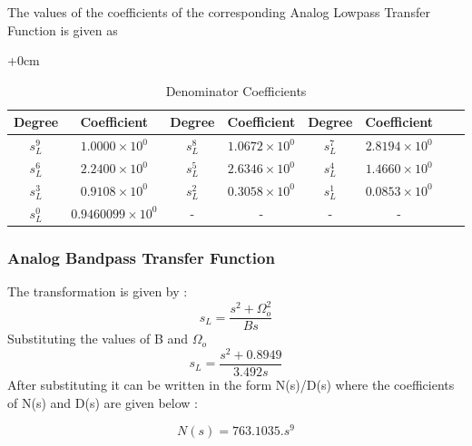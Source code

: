 \documentclass{article}
\begin{document}
The values of the coefficients of the corresponding Analog Lowpass Transfer Function  is given as
\begin{table}[H]
    \centering
    \begin{adjustwidth}{+0cm}{}
        \caption{Denominator Coefficients}
        \begin{tabular}{|c|c|c|c|c|c|c|c|}
            \hline
            Degree & Coefficient & Degree & Coefficient & Degree & Coefficient\\
            \hline
            $s_L^{9}$ & $1.0000 \times 10^{0}$ & $s_L^{8}$ & $1.0672 \times 10^{0}$ & $s_L^{7}$ & $2.8194 \times 10^{0}$ \\
            \hline
            $s_L^{6}$ & $2.2400 \times 10^{0}$ & $s_L^{5}$ & $2.6346 \times 10^{0}$ & $s_L^{4}$ & $1.4660 \times 10^{0}$ \\
            \hline
            $s_L^{3}$ & $0.9108 \times 10^{0}$ & $s_L^{2}$ & $0.3058 \times 10^{0}$ & $s_L^{1}$ & $0.0853 \times 10^{0}$ \\
            \hline
            $s_L^{0}$ & $0.9460099 \times 10^{0}$ & - & -& -&- \\
            \hline
        \end{tabular}
    \end{adjustwidth}
\end{table}
\subsubsection{Analog Bandpass Transfer Function}
The transformation is given by :
\begin{equation*}
    s_L = \frac{s^2 + \Omega_o^2 }{Bs}
\end{equation*}
Substituting the values of B and $\Omega_o$
\begin{equation*}
    s_L = \frac{s^2 + 0.8949}{3.492s}
\end{equation*}
After substituting it can be written in the form N(s)/D(s) where the coefficients of N(s) and D(s) are given below :

\begin{equation*}
    N(s) = 763.1035. s^{9} 
\end{equation*}
\end{document}
